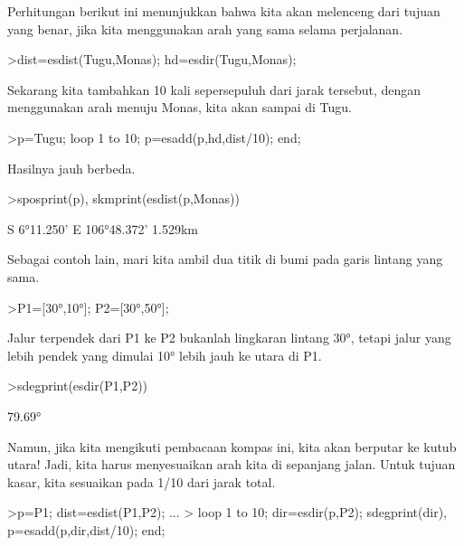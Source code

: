 \documentclass[a4paper,10pt]{article}
\begin{document}
\begin{eulernotebook}
\begin{eulercomment}
\begin{eulercomment}
\begin{eulercomment}
\begin{eulercomment}
\begin{eulercomment}
Perhitungan berikut ini menunjukkan bahwa kita akan melenceng dari
tujuan yang benar, jika kita menggunakan arah yang sama selama
perjalanan.
\end{eulercomment}
\begin{eulerprompt}
>dist=esdist(Tugu,Monas); hd=esdir(Tugu,Monas);
\end{eulerprompt}
\begin{eulercomment}
Sekarang kita tambahkan 10 kali sepersepuluh dari jarak tersebut,
dengan menggunakan arah menuju Monas, kita akan sampai di Tugu.
\end{eulercomment}
\begin{eulerprompt}
>p=Tugu; loop 1 to 10; p=esadd(p,hd,dist/10); end;
\end{eulerprompt}
\begin{eulercomment}
Hasilnya jauh berbeda.
\end{eulercomment}
\begin{eulerprompt}
>sposprint(p), skmprint(esdist(p,Monas))
\end{eulerprompt}
\begin{euleroutput}
  S 6°11.250' E 106°48.372'
       1.529km
\end{euleroutput}
\begin{eulercomment}
Sebagai contoh lain, mari kita ambil dua titik di bumi pada garis
lintang yang sama.
\end{eulercomment}
\begin{eulerprompt}
>P1=[30°,10°]; P2=[30°,50°];
\end{eulerprompt}
\begin{eulercomment}
Jalur terpendek dari P1 ke P2 bukanlah lingkaran lintang 30°, tetapi
jalur yang lebih pendek yang dimulai 10° lebih jauh ke utara di P1.
\end{eulercomment}
\begin{eulerprompt}
>sdegprint(esdir(P1,P2))
\end{eulerprompt}
\begin{euleroutput}
       79.69°
\end{euleroutput}
\begin{eulercomment}
Namun, jika kita mengikuti pembacaan kompas ini, kita akan berputar ke
kutub utara! Jadi, kita harus menyesuaikan arah kita di sepanjang
jalan. Untuk tujuan kasar, kita sesuaikan pada 1/10 dari jarak total.
\end{eulercomment}
\begin{eulerprompt}
>p=P1;  dist=esdist(P1,P2); ...
>  loop 1 to 10; dir=esdir(p,P2); sdegprint(dir), p=esadd(p,dir,dist/10); end;

\end{eulerprompt}
\end{eulercomment}
\end{eulercomment}
\end{eulercomment}
\end{eulercomment}
\end{eulernotebook}
\end{document}
